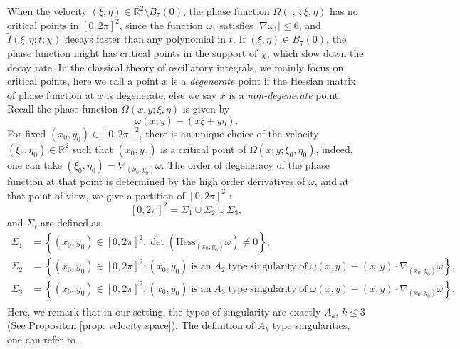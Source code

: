 \documentclass[12pt]{amsart}
\newcommand{\R}{\mathbb{R}}
\begin{document}
When the velocity $\left(\xi,\eta\right)\in \R^{2}\setminus B_{7}\left(0\right)$, the phase function $\Omega\left(\cdot,\cdot;\xi,\eta\right)$ has no critical points in $\left[0,2\pi\right]^{2}$, since the function $\omega_{1}$ satisfies $\left|\nabla\omega_{1}\right|\leq 6$, and $\widetilde{I}\left(\xi,\eta;t;\chi\right)$ decays faster than any polynomial in $t$. If $\left(\xi,\eta\right)\in B_{7}\left(0\right)$, the phase function might has critical points in the support of $\chi$, which slow down the decay rate. In the classical theory of oscillatory integrals, we mainly focus on  critical points, here we call a point $x$ is a \textit{degenerate} point if the Hessian matrix of phase function at $x$ is degenerate, else we say $x$ is a \textit{non-degenerate} point. 	
Recall the phase function $\Omega\left(x,y;\xi,\eta\right)$ is given by
\begin{equation*}
	\omega\left(x,y\right)-\left(x\xi+y\eta\right).
\end{equation*}
 For fixed $\left(x_{0},y_{0}\right)\in\left[0,2\pi\right]^{2}$, there is an unique choice of the velocity $\left(\xi_{0},\eta_{0}\right)\in\R^{2}$ such that $\left(x_{0},y_{0}\right)$ is a critical point of $\Omega\left(x,y;\xi_{0},\eta_{0}\right)$, indeed, one can take $\left(\xi_{0},\eta_{0}\right)=\nabla_{\left(x_{0},y_{0}\right)}\omega$. The order of degeneracy of the phase function at that point is determined by the high order derivatives of $\omega$, and at that point of view, we give a partition of $\left[0,2\pi\right]^{2}$ :
\begin{equation*}
	\left[0,2\pi\right]^{2}=\Sigma_{1}\cup\Sigma_{2}\cup\Sigma_{3},
\end{equation*}
and $\Sigma_{i}$ are defined as %
\begin{equation}\label{def: Sigmai}
	\begin{aligned}
		\Sigma_{1}&=\left\{\left(x_0,y_0\right)\in\left[0,2\pi\right]^{2}:\det\left(\mathrm{Hess}_{\left(x_0,y_0\right)}\omega\right)\neq0\right\},\\
		\Sigma_{2}&=\left\{\left(x_0,y_0\right)\in\left[0,2\pi\right]^{2}:\left(x_0,y_0\right)\;\mathrm{is\;an}\;A_{2}\;\mathrm{type\;singularity\;of}\;\omega\left(x,y\right)-\left(x,y\right)\cdot\nabla_{\left(x_0,y_0\right)}\omega\right\},\\
		\Sigma_{3}&=\left\{\left(x_0,y_0\right)\in\left[0,2\pi\right]^{2}:\left(x_0,y_0\right)\;\mathrm{is\;an}\;A_{3}\;\mathrm{type\;singularity\;of}\;\omega\left(x,y\right)-\left(x,y\right)\cdot\nabla_{\left(x_0,y_0\right)}\omega\right\}.\\
	\end{aligned}
\end{equation}
Here, we remark that in our setting, the types of singularity are exactly $A_k$, $k\leq 3$ (See Propositon \ref{prop: velocity space}). The definition of $A_k$ type singularities, one can refer to \cite{A1, A2, A3}.
\end{document}

